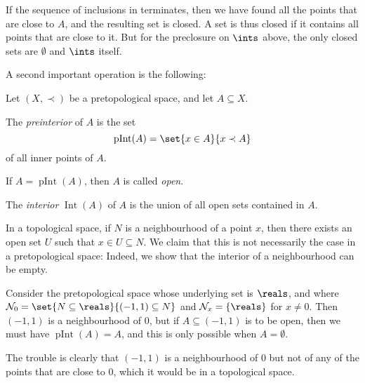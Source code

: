 \documentclass[article, a4paper, 11pt, oneside]{memoir}
\numberwithin{equation}{chapter}
\newcommand{\inpoint}{\prec}
\newcommand{\calN}{\mathcal{N}}
\newcommand{\nhoods}[1]{\calN_{#1}}
\newcommand{\pInt}[1]{\operatorname{pInt}(#1)}
\renewcommand{\interior}[1]{\operatorname{Int}(#1)}
\begin{document}
\begin{proofsec}
    If the sequence of inclusions in  terminates, then we have found all the points that are close to $A$, and the resulting set is closed. A set is thus closed if it contains all points that are close to it. But for the preclosure on $\ints$ above, the only closed sets are $\emptyset$ and $\ints$ itself.

\end{proofsec}

A second important operation is the following:

\begin{definition}
    Let $(X,\inpoint)$ be a pretopological space, and let $A \subseteq X$.
    \begin{enumdef}
        \item The \emph{preinterior} of $A$ is the set
        \begin{equation*}
            \pInt{A}
                = \set{x \in A}{x \inpoint A}
        \end{equation*}
        of all inner points of $A$.

        \item If $A = \pInt{A}$, then $A$ is called \emph{open}.
        
        \item The \emph{interior} $\interior{A}$ of $A$ is the union of all open sets contained in $A$.
    \end{enumdef}
\end{definition}

\begin{remark}
    In a topological space, if $N$ is a neighbourhood of a point $x$, then there exists an open set $U$ such that $x \in U \subseteq N$. We claim that this is not necessarily the case in a pretopological space: Indeed, we show that the interior of a neighbourhood can be empty.

    Consider the pretopological space whose underlying set is $\reals$, and where $\nhoods{0} = \set{N \subseteq \reals}{(-1,1) \subseteq N}$ and $\nhoods{x} = \{\reals\}$ for $x \neq 0$. Then $(-1,1)$ is a neighbourhood of $0$, but if $A \subseteq (-1,1)$ is to be open, then we must have $\pInt{A} = A$, and this is only possible when $A = \emptyset$.

    The trouble is clearly that $(-1,1)$ is a neighbourhood of $0$ but not of any of the points that are close to $0$, which it would be in a topological space.
\end{remark}
\end{document}
